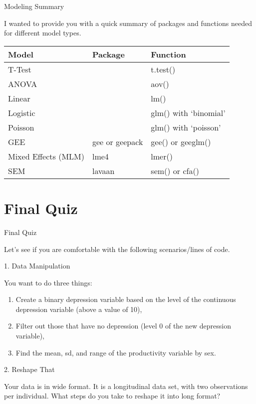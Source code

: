 \begin{frame}{Modeling Summary}

I wanted to provide you with a quick summary of packages and functions
needed for different model types.

\begin{longtable}[]{@{}lll@{}}
\toprule
Model & Package & Function\tabularnewline
\midrule
\endhead
T-Test & & t.test()\tabularnewline
ANOVA & & aov()\tabularnewline
Linear & & lm()\tabularnewline
Logistic & & glm() with `binomial'\tabularnewline
Poisson & & glm() with `poisson'\tabularnewline
GEE & gee or geepack & gee() or geeglm()\tabularnewline
Mixed Effects (MLM) & lme4 & lmer()\tabularnewline
SEM & lavaan & sem() or cfa()\tabularnewline
\bottomrule
\end{longtable}

\end{frame}

\section{Final Quiz}\label{final-quiz}

\begin{frame}{Final Quiz}

Let's see if you are comfortable with the following scenarios/lines of
code.

\end{frame}

\begin{frame}{1. Data Manipulation}

You want to do three things:

\begin{enumerate}
\def\labelenumi{\arabic{enumi}.}
\tightlist
\item
  Create a binary depression variable based on the level of the
  continuous depression variable (above a value of 10),
\item
  Filter out those that have no depression (level 0 of the new
  depression variable),
\item
  Find the mean, sd, and range of the productivity variable by sex.
\end{enumerate}

\end{frame}

\begin{frame}{2. Reshape That}

Your data is in wide format. It is a longitudinal data set, with two
observations per individual. What steps do you take to reshape it into
long format?

\end{frame}

